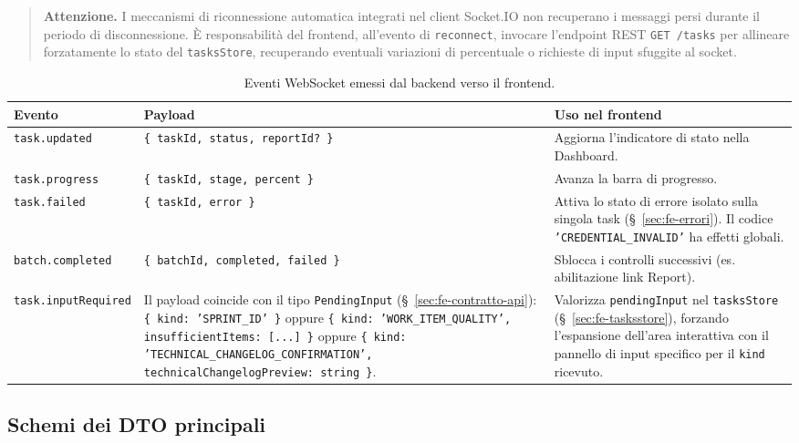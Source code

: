 \documentclass[11pt,a4paper]{article}
\begin{document}
\begin{quote}
\textbf{Attenzione.} I meccanismi di riconnessione automatica integrati nel client Socket.IO non recuperano i messaggi persi durante il periodo di disconnessione. È responsabilità del frontend, all'evento di \texttt{reconnect}, invocare l'endpoint REST \texttt{GET /tasks} per allineare forzatamente lo stato del \texttt{tasksStore}, recuperando eventuali variazioni di percentuale o richieste di input sfuggite al socket.
\end{quote}

\begin{table}[H]
\centering
\caption{Eventi WebSocket emessi dal backend verso il frontend.}
\label{tab:fe-ws-eventi}
\vspace{2mm}
\renewcommand{\arraystretch}{1.2}
\begin{tabularx}{\textwidth}{|l|X|X|}
\hline
\textbf{Evento} & \textbf{Payload} & \textbf{Uso nel frontend} \\ \hline
\texttt{task.updated} & \texttt{\{ taskId, status, reportId? \}} & Aggiorna l'indicatore di stato nella Dashboard. \\ \hline
\texttt{task.progress} & \texttt{\{ taskId, stage, percent \}} & Avanza la barra di progresso. \\ \hline
\texttt{task.failed} & \texttt{\{ taskId, error \}} & Attiva lo stato di errore isolato sulla singola task (\S~\ref{sec:fe-errori}). Il codice \texttt{'CREDENTIAL\_INVALID'} ha effetti globali. \\ \hline
\texttt{batch.completed} & \texttt{\{ batchId, completed, failed \}} & Sblocca i controlli successivi (es. abilitazione link Report). \\ \hline
\texttt{task.inputRequired} & Il payload coincide con il tipo \texttt{PendingInput} (\S~\ref{sec:fe-contratto-api}): \texttt{\{ kind: 'SPRINT\_ID' \}} oppure \texttt{\{ kind: 'WORK\_ITEM\_QUALITY', insufficientItems: [...] \}} oppure \texttt{\{ kind: 'TECHNICAL\_CHANGELOG\_CONFIRMATION', technicalChangelogPreview: string \}}. & Valorizza \texttt{pendingInput} nel \texttt{tasksStore} (\S~\ref{sec:fe-tasksstore}), forzando l'espansione dell'area interattiva con il pannello di input specifico per il \texttt{kind} ricevuto. \\ \hline
\end{tabularx}
\end{table}

\subsection{Schemi dei DTO principali}
\end{document}
